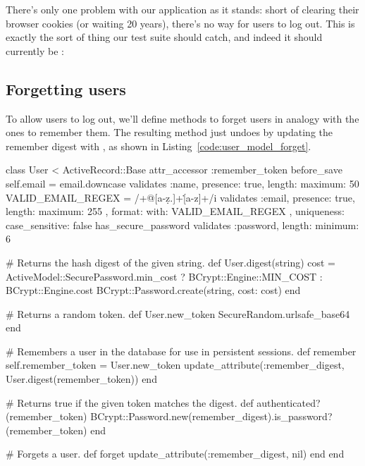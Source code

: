 There's only one problem with our application as it stands: short of clearing their browser cookies (or waiting 20 years), there's no way for users to log out. This is exactly the sort of thing our test suite should catch, and indeed it should currently be \failing:

\begin{codelisting}
\codecaption{\failing}
\end{codelisting}



\subsection{Forgetting users} %
\label{sec:forgetting_users}

To allow users to log out, we'll define methods to forget users in analogy with the ones to remember them. The resulting  method just undoes  by updating the remember digest with , as shown in Listing~\ref{code:user_model_forget}.

\begin{codelisting}
\label{code:user_model_forget}
\begin{code}
class User < ActiveRecord::Base
  attr_accessor :remember_token
  before_save { self.email = email.downcase }
  validates :name,  presence: true, length: { maximum: 50 }
  VALID_EMAIL_REGEX = /\A[\w+\-.]+@[a-z\d\-.]+\.[a-z]+\z/i
  validates :email, presence: true, length: { maximum: 255 },
                    format: { with: VALID_EMAIL_REGEX },
                    uniqueness: { case_sensitive: false }
  has_secure_password
  validates :password, length: { minimum: 6 }

  # Returns the hash digest of the given string.
  def User.digest(string)
    cost = ActiveModel::SecurePassword.min_cost ? BCrypt::Engine::MIN_COST :
                                                  BCrypt::Engine.cost
    BCrypt::Password.create(string, cost: cost)
  end

  # Returns a random token.
  def User.new_token
    SecureRandom.urlsafe_base64
  end

  # Remembers a user in the database for use in persistent sessions.
  def remember
    self.remember_token = User.new_token
    update_attribute(:remember_digest, User.digest(remember_token))
  end

  # Returns true if the given token matches the digest.
  def authenticated?(remember_token)
    BCrypt::Password.new(remember_digest).is_password?(remember_token)
  end

  # Forgets a user.
  def forget
    update_attribute(:remember_digest, nil)
  end
end
\end{code}
\end{codelisting}

